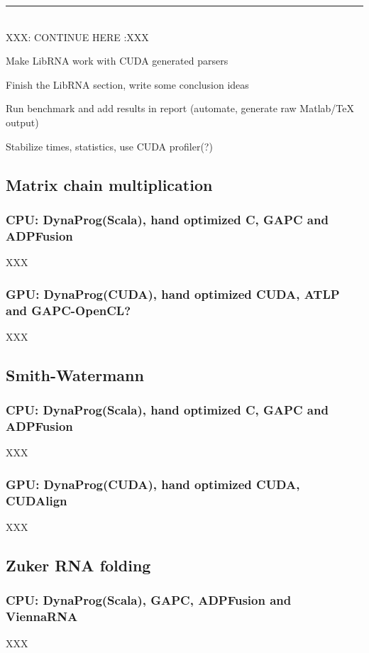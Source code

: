 {\center\color{red} \noindent\rule{16cm}{0.4pt} \\ XXX: CONTINUE HERE :XXX \\}

{\color{red}\ol
\item Make LibRNA work with CUDA generated parsers
\item Finish the LibRNA section, write some conclusion ideas
\item Run benchmark and add results in report (automate, generate raw Matlab/TeX output)
\item Stabilize times, statistics, use CUDA profiler(?)
\ole}

\subsection{Matrix chain multiplication}
\subsubsection{CPU: DynaProg(Scala), hand optimized C, GAPC and ADPFusion}
XXX

\subsubsection{GPU: DynaProg(CUDA), hand optimized CUDA, ATLP and GAPC-OpenCL?}
XXX

\subsection{Smith-Watermann}
\subsubsection{CPU: DynaProg(Scala), hand optimized C, GAPC and ADPFusion}
XXX

\subsubsection{GPU: DynaProg(CUDA), hand optimized CUDA, CUDAlign}
XXX

\subsection{Zuker RNA folding}
\subsubsection{CPU: DynaProg(Scala), GAPC, ADPFusion and ViennaRNA}
XXX

